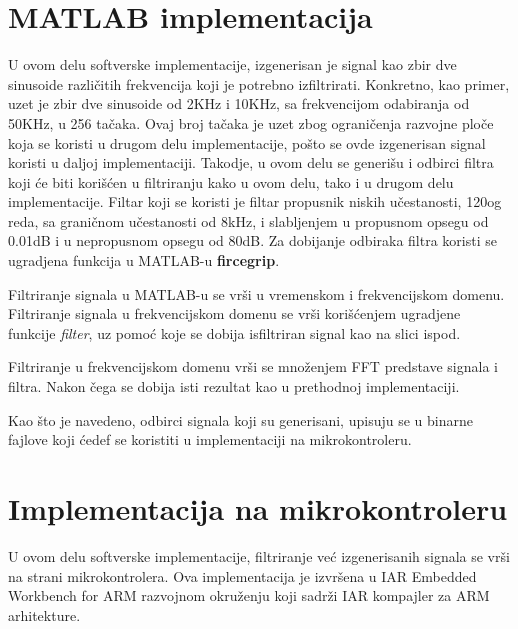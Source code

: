 \documentclass[a4paper,12pt, projekat]{etf}
\begin{document}
		\section{MATLAB implementacija}
		U ovom delu softverske implementacije, izgenerisan je signal kao zbir dve sinusoide razli\v{c}itih
		frekvencija koji je potrebno izfiltrirati. Konkretno, kao primer, uzet je zbir dve sinusoide od 2KHz
		i 10KHz, sa frekvencijom odabiranja od 50KHz, u 256 ta\v{c}aka. Ovaj broj ta\v{c}aka je uzet zbog 
		ograni\v{c}enja razvojne plo\v{c}e koja se koristi u drugom delu implementacije, po\v{s}to se ovde 
		izgenerisan signal koristi u daljoj implementaciji. Takodje, u ovom delu se generi\v{s}u i odbirci
		filtra koji \'{c}e biti kori\v{s}\'{c}en u filtriranju kako u ovom delu, tako i u drugom delu 
		implementacije. Filtar koji se koristi je filtar propusnik niskih u\v{c}estanosti, 120og reda, sa 
		grani\v{c}nom u\v{c}estanosti od 8kHz, i slabljenjem u propusnom opsegu od 0.01dB i u nepropusnom 
		opsegu od 80dB. Za dobijanje odbiraka filtra koristi se ugradjena funkcija u MATLAB-u \textbf{fircegrip}.
		
		
		Filtriranje signala u MATLAB-u se vr\v{s}i u vremenskom i frekvencijskom domenu. Filtriranje signala
		u frekvencijskom domenu se vr\v{s}i kori\v{s}\'{c}enjem ugradjene funkcije \textit{filter}, uz pomo\'{c}
		koje se dobija isfiltriran signal kao na slici ispod.
		
		
		Filtriranje u frekvencijskom domenu vr\v{s}i se mno\v{z}enjem FFT predstave signala i filtra. Nakon 
		\v{c}ega se dobija isti rezultat kao u prethodnoj implementaciji.
		
		
		Kao \v{s}to je navedeno, odbirci signala koji su generisani, upisuju se u binarne fajlove koji \'{c}edef
		se koristiti u implementaciji na mikrokontroleru.
		
        \section{Implementacija na mikrokontroleru}
		U ovom delu softverske implementacije, filtriranje ve\'{c} izgenerisanih signala se vr\v{s}i na 
		strani mikrokontrolera. Ova implementacija je izvr\v{s}ena u IAR Embedded Workbench for ARM razvojnom
		okru\v{z}enju koji sadr\v{z}i IAR kompajler za ARM arhitekture.
		
\end{document}
